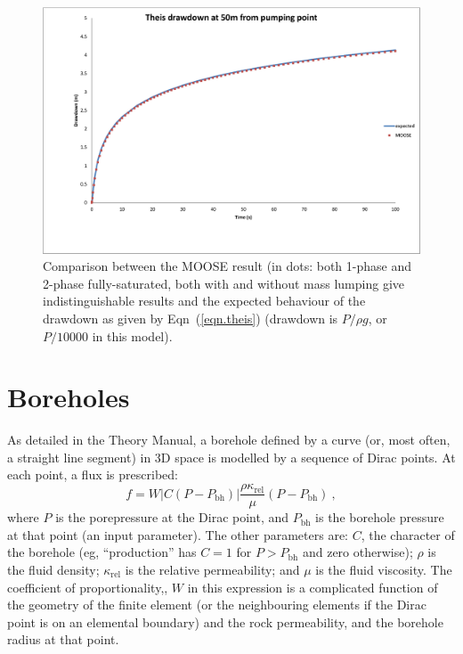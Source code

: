 \documentclass[]{scrreprt}
\begin{document}
\begin{figure}[htb]
\centering
\includegraphics[width=14cm]{th01.eps}
\caption{Comparison between the MOOSE result (in dots: both 1-phase
  and 2-phase fully-saturated, both with and without mass lumping give
  indistinguishable results and the
  expected behaviour of the drawdown as given by Eqn~(\ref{eqn.theis})
  (drawdown is $P/\rho g$, or $P/10000$ in this model).}
\label{th01.fig}
\end{figure}


\chapter{Boreholes}
\label{bh}

As detailed in the Theory Manual, a borehole defined by a curve (or,
most often, a straight line segment) in 3D space is modelled by a
sequence of Dirac points.  At each point, a flux is prescribed:
\begin{equation}
f = W|C(P-P_{\mathrm{bh}})| \frac{\rho \kappa_{\mathrm{rel}}}{\mu} (P - P_{\mathrm{bh}}) \ ,
\label{bh.propto.eqn}
\end{equation}
where $P$ is the porepressure at the Dirac point, and
$P_{\mathrm{bh}}$ is the borehole pressure at that point (an input
parameter).  The other parameters are: $C$, the character of the
borehole (eg, ``production'' has $C=1$ for $P>P_{\mathrm{bh}}$ and zero
otherwise); $\rho$ is the fluid density; $\kappa_{\mathrm{rel}}$ is
the relative permeability; and $\mu$ is the fluid viscosity.   The
coefficient of proportionality,, $W$ in this expression is a
complicated function of the geometry of the finite element (or the
neighbouring elements if the Dirac point is on an elemental boundary)
and the rock permeability, and the borehole radius at that point.
\end{document}
